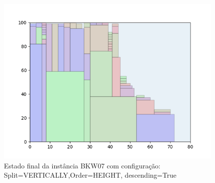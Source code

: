 \begin{figure}[H]
    \centering
    \caption[]{Estado final da instância BKW07 com configuração: Split=VERTICALLY,Order=HEIGHT, descending=True}
    \label{fig:bkw07-vertically-height-true}
    \includegraphics[scale=0.5]{output/figures/bkw/bkw07/vertically/height/true/00}
\end{figure}